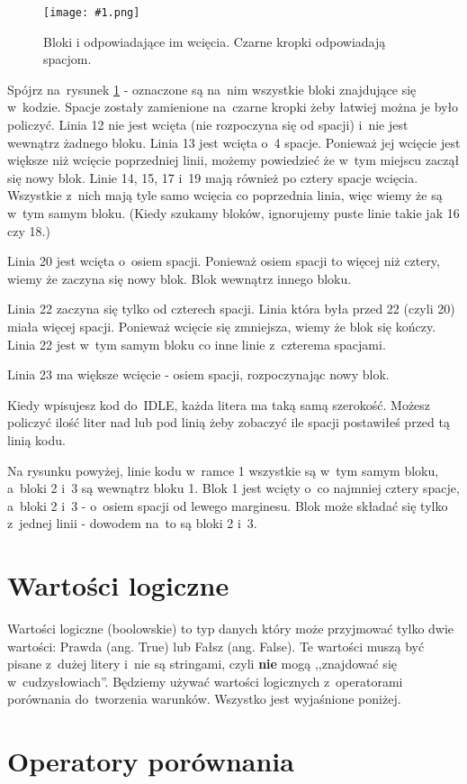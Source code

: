\documentclass{book}
\newcommand{\img}[3]{
\begin{figure}
\centerline{
	\texttt{[image: \#1.png]}
}
\caption{#2}
\label{#1}
\end{figure}
}
\begin{document}
\img{guess-blocks}{Bloki i odpowiadające im wcięcia. Czarne kropki odpowiadają spacjom.}{7cm}

Spójrz na~rysunek \ref{guess-blocks} - oznaczone są na~nim wszystkie bloki znajdujące się w~kodzie. Spacje zostały zamienione na~czarne kropki żeby łatwiej można je było policzyć. Linia 12 nie jest wcięta (nie rozpoczyna się od spacji) i~nie jest wewnątrz żadnego bloku. Linia 13 jest wcięta o~4 spacje. Ponieważ jej wcięcie jest większe niż wcięcie poprzedniej linii, możemy powiedzieć że w~tym miejscu zaczął się nowy blok. Linie 14, 15, 17 i~19 mają również po cztery spacje wcięcia. Wszystkie z~nich mają tyle samo wcięcia co poprzednia linia, więc wiemy że są w~tym samym bloku. (Kiedy szukamy bloków, ignorujemy puste linie takie jak 16 czy 18.)

Linia 20 jest wcięta o~osiem spacji. Ponieważ osiem spacji to więcej niż cztery, wiemy że zaczyna się nowy blok. Blok wewnątrz innego bloku.

Linia 22 zaczyna się tylko od czterech spacji. Linia która była przed 22 (czyli 20) miała więcej spacji. Ponieważ wcięcie się zmniejsza, wiemy że blok się kończy. Linia 22 jest w~tym samym bloku co inne linie z~czterema spacjami.

Linia 23 ma większe wcięcie - osiem spacji, rozpoczynając nowy blok.

Kiedy wpisujesz kod do~IDLE, każda litera ma taką samą szerokość. Możesz policzyć ilość liter nad lub pod linią żeby zobaczyć ile spacji postawiłeś przed tą linią kodu.

Na rysunku powyżej, linie kodu w~ramce 1 wszystkie są w~tym samym bloku, a~bloki 2 i~3 są wewnątrz bloku 1. Blok 1 jest wcięty o~co najmniej cztery spacje, a~bloki 2 i~3 - o~osiem spacji od lewego marginesu. Blok może składać się tylko z~jednej linii - dowodem na~to są bloki 2 i~3.

\section{Wartości logiczne}

Wartości logiczne (boolowskie) to typ danych który może przyjmować tylko dwie wartości: Prawda (ang. True) lub Fałsz (ang. False). Te wartości muszą być pisane z~dużej litery i~nie są stringami, czyli {\bf nie} mogą ,,znajdować się w~cudzysłowiach''. Będziemy używać wartości logicznych z~operatorami porównania do~tworzenia warunków. Wszystko jest wyjaśnione poniżej.

\section{Operatory porównania}
\end{document}

